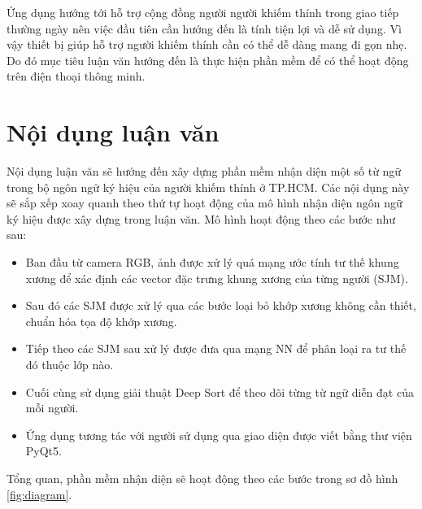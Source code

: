 Ứng dụng hướng tới hỗ trợ cộng đồng người người khiếm thính trong giao tiếp thường ngày nên việc đầu tiên cần hướng đến là tính tiện lợi và dễ sử dụng. Vì vậy thiết bị giúp hỗ trợ người khiếm thính cần có thể dễ dàng mang đi gọn nhẹ. Do đó mục tiêu luận văn hướng đến là thực hiện phần mềm để có thể hoạt động trên điện thoại thông minh. 

\section{Nội dụng luận văn}
Nội dụng luận văn sẽ hướng đến xây dựng phần mềm nhận diện một số từ ngữ trong bộ ngôn ngữ ký hiệu của người khiếm thính ở TP.HCM. Các nội dụng này sẽ sắp xếp xoay quanh theo thứ tự hoạt động của mô hình nhận diện ngôn ngữ ký hiệu được xây dựng trong luận văn. Mô hình hoạt động theo các bước như sau:
\begin{itemize}
\item Ban đầu từ camera RGB, ảnh được xử lý quá mạng ước tính tư thế khung xương để xác định các vector đặc trưng khung xương của từng người (SJM). 
\item Sau đó các SJM được xử lý qua các bước loại bỏ khớp xương không cần thiết, chuẩn hóa tọa độ khớp xương. 
\item Tiếp theo các SJM sau xử lý được đưa qua mạng NN để phân loại ra tư thế đó thuộc lớp nào.
\item Cuối cùng sử dụng giải thuật Deep Sort để theo dõi từng từ ngữ diễn đạt của mỗi người.
\item Ứng dụng tương tác với người sử dụng qua giao diện được viết bằng thư viện PyQt5. 
\end{itemize}

Tổng quan, phần mềm nhận diện sẽ hoạt động theo các bước trong sơ đồ hình \ref{fig:diagram}.


